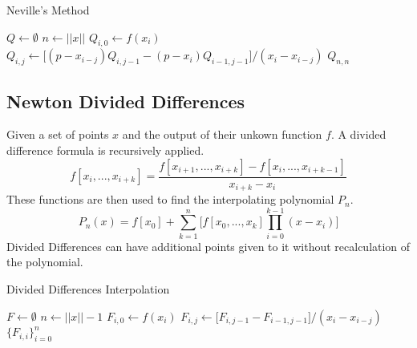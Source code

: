 \documentclass[12pt]{article}
\numberwithin{equation}{subsection}
\begin{document}
            \begin{center}
            \begin{algorithm}[H]
                \caption{Neville's Method}
                \begin{algorithmic}[1]
                    \State $Q \gets \emptyset$
                    \State $n \gets ||x||$
                        \State $Q_{i,0} \gets f(x_i)$
                    \EndFor
                            \State $Q_{i,j} \gets \big[(p-x_{i-j})Q_{i,j-1}-(p-x_i)Q_{i-1,j-1}\big]/(x_i - x_{i-j}) $
                        \EndFor
                    \EndFor
                    \State \Return $Q_{n,n}$
                    \EndProcedure
                \end{algorithmic}
            \end{algorithm}
            \end{center}


        \subsection{Newton Divided Differences}

            Given a set of points $x$ and the output of their
            unkown function $f$. A divided difference formula is recursively
            applied.
            $$ f[x_i, ..., x_{i+k}] = \frac{f[x_{i+1},...,x_{i+k}] - f[x_{i},...,x_{i+k-1}]}{x_{i+k} - x_i}$$
            These functions are then used to find the interpolating polynomial
            $P_n$.
            $$P_n(x) = f[x_0] + \sum_{k=1}^n \Big[ f[x_0,...,x_k] \prod_{i=0}^{k-1} (x - x_i) \Big]$$
            Divided Differences can have additional points given to it without
            recalculation of the polynomial.


            \begin{center}
            \begin{algorithm}[H]
                \caption{Divided Differences Interpolation}
                \begin{algorithmic}[1]
                    \State $F \gets \emptyset$
                    \State $n \gets ||x|| - 1$
                        \State $F_{i,0} \gets f(x_i)$
                    \EndFor
                            \State $F_{i,j} \gets \big[F_{i,j-1}-F_{i-1,j-1}\big]/(x_i - x_{i-j}) $
                        \EndFor
                    \EndFor
                    \State \Return $\{F_{i,i}\}_{i=0}^{n}$
                    \EndProcedure
                \end{algorithmic}
            \end{algorithm}
            \end{center}
\end{document}
